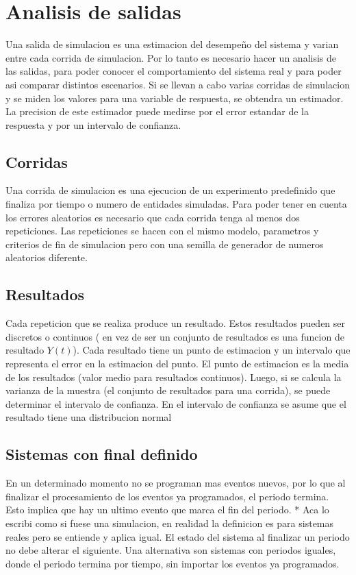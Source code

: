 \documentclass[a4paper]{article}
\begin{document}
\section*{Analisis de salidas}
Una salida de simulacion es una estimacion del desempeño del sistema y varian entre cada corrida de 
simulacion. Por lo tanto es necesario hacer un analisis de las salidas, para poder conocer el 
comportamiento del sistema real y para poder asi comparar distintos escenarios.
Si se llevan a cabo varias corridas de simulacion y se miden los valores para una variable de 
respuesta, se obtendra un estimador. La precision de este estimador puede medirse por el error 
estandar de la respuesta y por un intervalo de confianza.

\subsection*{Corridas}
Una corrida de simulacion es una ejecucion de un experimento predefinido que finaliza por tiempo o numero
de entidades simuladas. 
Para poder tener en cuenta los errores aleatorios es necesario que cada corrida tenga al menos dos 
repeticiones. Las repeticiones se hacen con el mismo modelo, parametros y criterios de fin de simulacion pero
con una semilla de generador de numeros aleatorios diferente.

\subsection*{Resultados}
Cada repeticion que se realiza produce un resultado. Estos resultados pueden ser discretos o continuos (
en vez de ser un conjunto de resultados es una funcion de resultado $Y(t)$).
Cada resultado tiene un punto de estimacion y un intervalo que representa el error en la estimacion del punto.
El punto de estimacion es la media de los resultados (valor medio para resultados continuos).
Luego, si se calcula la varianza de la muestra (el conjunto de resultados para una corrida), se puede determinar 
el intervalo de confianza. En el intervalo de confianza se asume que el resultado tiene una distribucion normal

\subsection*{Sistemas con final definido}
En un determinado momento no se programan mas eventos nuevos, por lo que al finalizar el procesamiento 
de los eventos ya programados, el periodo termina. Esto implica que hay un ultimo evento que marca el fin del
periodo. * Aca lo escribi como si fuese una simulacion, en realidad la definicion es para sistemas reales pero se 
entiende y aplica igual.
El estado del sistema al finalizar un periodo no debe alterar el siguiente.
Una alternativa son sistemas con periodos iguales, donde el periodo termina por tiempo, sin importar los eventos 
ya programados.
\end{document}
